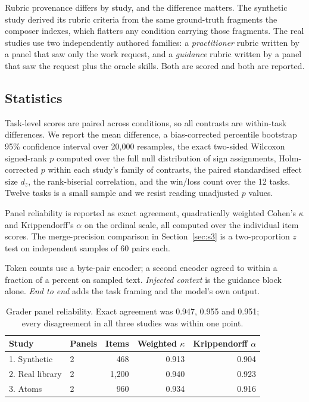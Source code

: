 \documentclass[11pt]{article}
\begin{document}
Rubric provenance differs by study, and the difference matters. The synthetic study derived its
rubric criteria from the same ground-truth fragments the composer indexes, which flatters any
condition carrying those fragments. The real studies use two independently authored families: a
\emph{practitioner} rubric written by a panel that saw only the work request, and a \emph{guidance}
rubric written by a panel that saw the request plus the oracle skills. Both are scored and both are
reported.

\subsection{Statistics}

Task-level scores are paired across conditions, so all contrasts are within-task differences. We
report the mean difference, a bias-corrected percentile bootstrap 95\% confidence interval over
20,000 resamples, the exact two-sided Wilcoxon signed-rank $p$ computed over the full null
distribution of sign assignments, Holm-corrected $p$ within each study's family of contrasts, the
paired standardised effect size $d_z$, the rank-biserial correlation, and the win/loss count over
the 12 tasks. Twelve tasks is a small sample and we resist reading unadjusted $p$ values.

Panel reliability is reported as exact agreement, quadratically weighted Cohen's $\kappa$ and
Krippendorff's $\alpha$ on the ordinal scale, all computed over the individual item scores. The
merge-precision comparison in Section~\ref{sec:s3} is a two-proportion $z$ test on independent
samples of 60 pairs each.

Token counts use a byte-pair encoder; a second encoder agreed to within a fraction of a percent on
sampled text. \emph{Injected context} is the guidance block alone. \emph{End to end} adds the task
framing and the model's own output.

\begin{table}[t]\centering\small
\begin{tabular}{llrrr}
\toprule
Study & Panels & Items & Weighted $\kappa$ & Krippendorff $\alpha$ \\
\midrule
1. Synthetic & 2 & 468 & 0.913 & 0.904 \\
2. Real library & 2 & 1{,}200 & 0.940 & 0.923 \\
3. Atoms & 2 & 960 & 0.934 & 0.916 \\
\bottomrule
\end{tabular}
\caption{Grader panel reliability. Exact agreement was 0.947, 0.955 and 0.951; every disagreement
in all three studies was within one point.}
\label{tab:rel}
\end{table}
\end{document}
